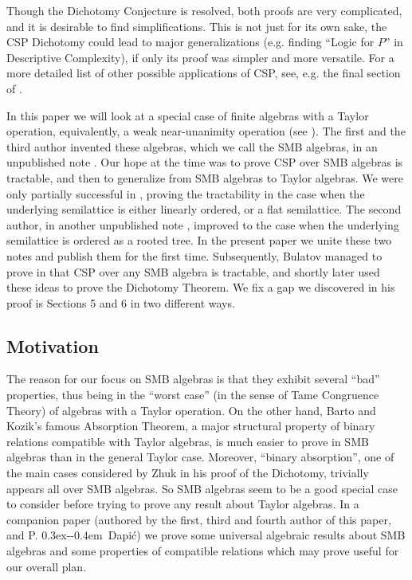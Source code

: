 \documentclass[11pt]{amsart}
\def\Dj{\mbox{\raise0.3ex\hbox{-}\kern-0.4em D}}
\theoremstyle{definition}
\begin{document}
Though the Dichotomy Conjecture is resolved, both proofs are very complicated, and it is desirable to find simplifications. This is not just for its own sake, the CSP Dichotomy could lead to major generalizations (e.g. finding ``Logic for $P$'' in Descriptive Complexity), if only its proof was simpler and more versatile. For a more detailed list of other possible applications of CSP, see, e.g. the final section of \cite{Bulect}.

In this paper we will look at a special case of finite algebras with a Taylor operation, equivalently, a weak near-unanimity operation (see \cite{MM}). The first and the third author invented these algebras, which we call the SMB algebras, in an unpublished note \cite{RP}. Our hope at the time was to prove CSP over SMB algebras is tractable, and then to generalize from SMB algebras to Taylor algebras. We were only partially successful in \cite{RP}, proving the tractability in the case when the underlying semilattice is either linearly ordered, or a flat semilattice. The second author, in another unpublished note \cite{M2}, improved to the case when the underlying semilattice is ordered as a rooted tree. In the present paper we unite these two notes and publish them for the first time. Subsequently, Bulatov managed to prove in \cite{BuSMB} that CSP over any SMB algebra is tractable, and shortly later used these ideas to prove the Dichotomy Theorem. We fix a gap we discovered in his proof is Sections 5 and 6 in two different ways.

\subsection{Motivation} 

The reason for our focus on SMB algebras is that they exhibit several ``bad'' properties, thus being in the ``worst case'' (in the sense of Tame Congruence Theory) of algebras with a Taylor operation. On the other hand, Barto and Kozik's famous Absorption Theorem, a major structural property of binary relations compatible with Taylor algebras, is much easier to prove in SMB algebras than in the general Taylor case. Moreover, ``binary absorption'', one of the main cases considered by Zhuk in his proof of the Dichotomy, trivially appears all over SMB algebras. So SMB algebras seem to be a good special case to consider before trying to prove any result about Taylor algebras. In a companion paper \cite{SMB1} (authored by the first, third and fourth author of this paper, and P. \Dj api\'{c}) we prove some universal algebraic results about SMB algebras and some properties of compatible relations which may prove useful for our overall plan.
\end{document}
